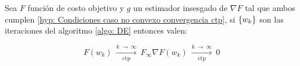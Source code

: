 \begin{theorem}
	Sea $F$ funci\'on de costo objetivo y $g$ un estimador insesgado de $\nabla F$ tal que ambos cumplen \ref{hyp: Condiciones caso no convexo convergencia ctp}, si $\left\lbrace w_k\right\rbrace$ son las iteraciones del algoritmo \ref{algo: DE} entonces valen:
	
		\begin{subequations}
		\begin{equation}
		F(w_k) \ \xrightarrow[\text{ctp}]{k \ \rightarrow \ \infty } \ F_{\infty}
		\end{equation}
		\begin{equation}
		\nabla F(w_k) \ \xrightarrow[\text{ctp}]{k \ \rightarrow \ \infty } \ 0
		\end{equation}
	\end{subequations}
	
\end{theorem}

